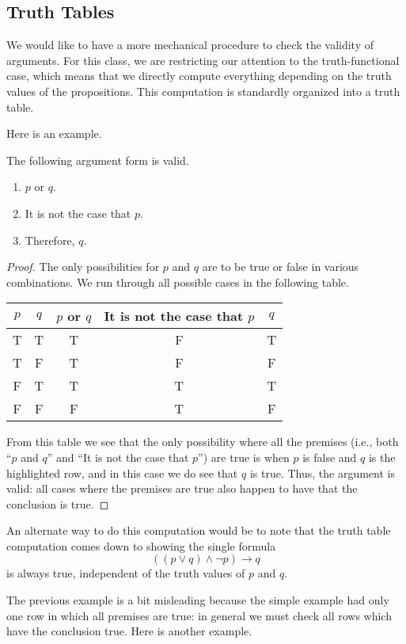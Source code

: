 \subsection{Truth Tables}
We would like to have a more mechanical procedure to check the validity of arguments. For this class, we are restricting our attention to the truth-functional case, which means that we directly compute everything depending on the truth values of the propositions. This computation is standardly organized into a truth table.

Here is an example.
\begin{exe}
	The following argument form is valid.
	\begin{enumerate}
		\item $p$ or $q$.
		\item It is not the case that $p$.
		\item Therefore, $q$.
	\end{enumerate}
\end{exe}
\begin{proof}
	The only possibilities for $p$ and $q$ are to be true or false in various combinations. We run through all possible cases in the following table.
	\begin{center}
		\begin{tabular}{c|c||c|c||c}
			$p$ & $q$ & $p$ or $q$ & It is not the case that $p$ & $q$ \\\hline
			T & T & T & F & T \\
			T & F & T & F & F \\
			\color{red}F & \color{red}T & \color{red}T & \color{red}T & \color{red}T \\
			F & F & F & T & F
		\end{tabular}
	\end{center}
	From this table we see that the only possibility where all the premises (i.e., both ``$p$ and $q$'' and ``It is not the case that $p$'') are true is when $p$ is false and $q$ is the highlighted row, and in this case we do see that $q$ is true. Thus, the argument is valid: all cases where the premises are true also happen to have that the conclusion is true.
\end{proof}
\begin{remark}
	An alternate way to do this computation would be to note that the truth table computation comes down to showing the single formula
	\[((p\lor q)\land\lnot p)\to q\]
	is always true, independent of the truth values of $p$ and $q$.
\end{remark}
The previous example is a bit misleading because the simple example had only one row in which all premises are true: in general we must check all rows which have the conclusion true. Here is another example.
